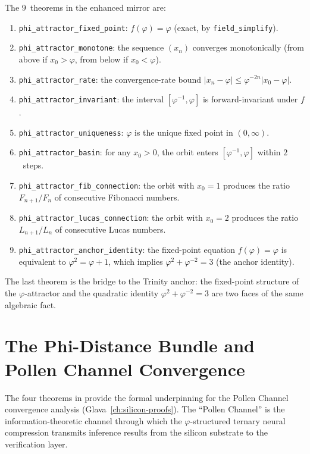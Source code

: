 The $9$~theorems in the enhanced mirror are:

\begin{enumerate}
  \item \texttt{phi\_attractor\_fixed\_point}: $f(\varphi) = \varphi$
        (exact, by \texttt{field\_simplify}).
  \item \texttt{phi\_attractor\_monotone}: the sequence $(x_n)$
        converges monotonically (from above if $x_0 > \varphi$,
        from below if $x_0 < \varphi$).
  \item \texttt{phi\_attractor\_rate}: the convergence-rate bound
        $|x_n - \varphi| \leq \varphi^{-2n} |x_0 - \varphi|$.
  \item \texttt{phi\_attractor\_invariant}: the interval
        $[\varphi^{-1}, \varphi]$ is forward-invariant under $f$.
  \item \texttt{phi\_attractor\_uniqueness}: $\varphi$ is the unique
        fixed point in $(0, \infty)$.
  \item \texttt{phi\_attractor\_basin}: for any $x_0 > 0$, the orbit
        enters $[\varphi^{-1}, \varphi]$ within $2$~steps.
  \item \texttt{phi\_attractor\_fib\_connection}: the orbit with
        $x_0 = 1$ produces the ratio $F_{n+1}/F_n$ of consecutive
        Fibonacci numbers.
  \item \texttt{phi\_attractor\_lucas\_connection}: the orbit with
        $x_0 = 2$ produces the ratio $L_{n+1}/L_n$ of consecutive
        Lucas numbers.
  \item \texttt{phi\_attractor\_anchor\_identity}: the fixed-point
        equation $f(\varphi) = \varphi$ is equivalent to
        $\varphi^2 = \varphi + 1$, which implies
        $\varphi^2 + \varphi^{-2} = 3$ (the anchor identity).
\end{enumerate}

The last theorem is the bridge to the Trinity anchor: the fixed-point
structure of the $\varphi$-attractor and the quadratic identity
$\varphi^2 + \varphi^{-2} = 3$ are two faces of the same algebraic
fact.

\section{The Phi-Distance Bundle and Pollen Channel Convergence}
\label{sec:ext:phi-distance}

The four theorems in  provide
the formal underpinning for the Pollen Channel convergence analysis
(Glava~\ref{ch:silicon-proofs}). The ``Pollen Channel'' is the
information-theoretic channel through which the $\varphi$-structured
ternary neural compression transmits inference results from the silicon
substrate to the verification layer.

